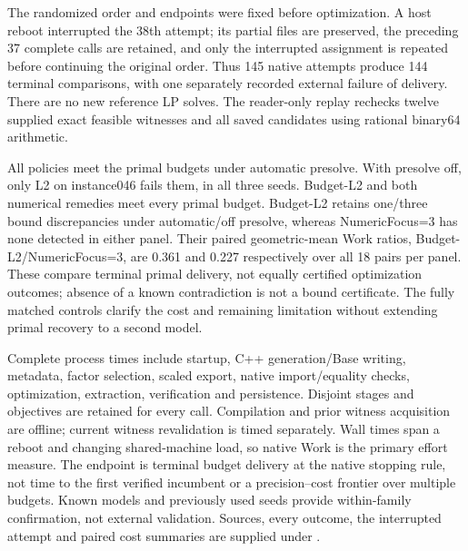 \documentclass[11pt]{article}
\begin{document}
The randomized order and endpoints were fixed before optimization. A host reboot
interrupted the 38th attempt; its partial files are preserved, the preceding
37 complete calls are retained, and only the interrupted assignment is repeated
before continuing the original order. Thus 145 native attempts produce 144 terminal
comparisons, with one separately recorded external failure of delivery. There are
no new reference LP solves. The reader-only replay rechecks twelve supplied exact
feasible witnesses and all saved candidates using rational binary64 arithmetic.

All policies meet the primal budgets under automatic presolve. With presolve off,
only L2 on instance046 fails them, in all three seeds. Budget-L2 and both numerical
remedies meet every primal budget. Budget-L2 retains one/three bound discrepancies
under automatic/off presolve, whereas NumericFocus=3 has none detected in either
panel. Their paired geometric-mean Work ratios, Budget-L2/NumericFocus=3, are
0.361 and 0.227 respectively over all 18 pairs per panel. These compare terminal
primal delivery, not equally certified optimization outcomes; absence of a known
contradiction is not a bound certificate. The fully matched controls clarify the
cost and remaining limitation without extending primal recovery to a second model.

\begin{table}[tb]
\centering\small\setlength{\tabcolsep}{3pt}
\caption{Fully matched numerical remedies. Upper: each policy has 18 terminal calls
per presolve setting; ``Budgets'' counts points meeting all 4,320 audited rows after
integer rounding. Max. $v_V$ is the largest activation violation in
m\textsuperscript{3}; $B>U$ and Gap flags follow Table~S11. Limits counts native
time limits. Work is the geometric mean of all terminal calls, including flagged
completions; Total is the median entire fresh-process time in seconds. Lower:
per-model compliance among three seeds with presolve disabled. Absence of a bound
or gap flag does not certify optimality. The interrupted attempt is retained
separately rather than imputed or counted as a completed replicate.}
\label{tab:matched-accuracy}
\resizebox{\linewidth}{!}{}
\par\medskip

\end{table}

Complete process times include startup, C++ generation/Base writing, metadata,
factor selection, scaled export, native import/equality checks, optimization,
extraction, verification and persistence. Disjoint stages and objectives are
retained for every call. Compilation and prior witness acquisition are offline;
current witness revalidation is timed separately. Wall times span a reboot and
changing shared-machine load, so native Work is the primary effort measure.
The endpoint is terminal budget delivery at the native stopping rule, not time
to the first verified incumbent or a precision--cost frontier over multiple budgets.
Known models and previously used seeds provide within-family confirmation,
not external validation. Sources, every outcome, the interrupted attempt and
paired cost summaries are supplied under
.
\end{document}
